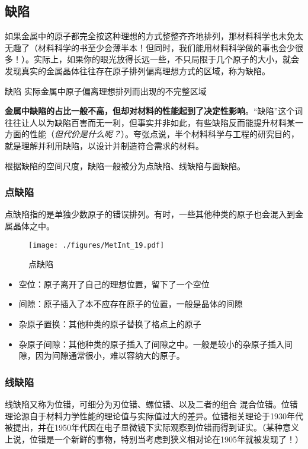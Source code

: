\subsection{缺陷}
如果金属中的原子都完全按这种理想的方式整整齐齐地排列，那材料科学也未免太无趣了（材料科学的书至少会薄半本！但同时，我们能用材料科学做的事也会少很多！）。实际上，如果你的眼光放得长远一些，不只局限于几个原子的大小，就会发现真实的金属晶体往往存在原子排列偏离理想方式的区域，称为缺陷。

\begin{definition}{缺陷}
实际金属中原子偏离理想排列而出现的不完整区域
\end{definition}

\textbf{金属中缺陷的占比一般不高，但却对材料的性能起到了决定性影响}。“缺陷”这个词往往让人以为缺陷百害而无一利，但事实并非如此，有些缺陷反而能提升材料某一方面的性能（\textsl{但代价是什么呢？}）。夸张点说，半个材料科学与工程的研究目的，就是理解并利用缺陷，以设计并制造符合需求的材料。

根据缺陷的空间尺度，缺陷一般被分为点缺陷、线缺陷与面缺陷。

\subsubsection{点缺陷}
点缺陷指的是单独少数原子的错误排列。有时，一些其他种类的原子也会混入到金属晶体之中。
\begin{figure}[ht]
\centering
\texttt{[image: ./figures/MetInt\_19.pdf]}
\caption{点缺陷} \label{MetInt_fig19}
\end{figure}

\begin{itemize}
\item 空位：原子离开了自己的理想位置，留下了一个空位
\item 间隙：原子插入了本不应存在原子的位置，一般是晶体的间隙
\item 杂原子置换：其他种类的原子替换了格点上的原子
\item 杂原子间隙：其他种类的原子插入了间隙之中。一般是较小的杂原子插入间隙，因为间隙通常很小，难以容纳大的原子。
\end{itemize}

\subsubsection{线缺陷}
线缺陷又称为位错，可细分为刃位错、螺位错、以及二者的组合 混合位错。位错理论源自于材料力学性能的理论值与实际值过大的差异。位错相关理论于1930年代被提出，并在1950年代因在电子显微镜下实际观察到位错而得到证实。（某种意义上说，位错是一个新鲜的事物，特别当考虑到狭义相对论在1905年就被发现了！）

